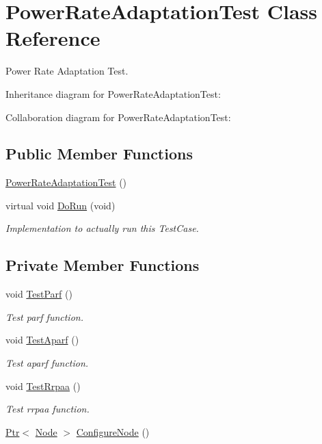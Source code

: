 \hypertarget{classPowerRateAdaptationTest}{}\section{Power\+Rate\+Adaptation\+Test Class Reference}
\label{classPowerRateAdaptationTest}


Power Rate Adaptation Test.  




Inheritance diagram for Power\+Rate\+Adaptation\+Test\+:


Collaboration diagram for Power\+Rate\+Adaptation\+Test\+:
\subsection*{Public Member Functions}
\begin{DoxyCompactItemize}
\item 
\hyperlink{classPowerRateAdaptationTest_a7c9dabaff02e1e82491e0a1106c2fcb8}{Power\+Rate\+Adaptation\+Test} ()
\item 
virtual void \hyperlink{classPowerRateAdaptationTest_aab868cfafe1fcef3c1a777720571147d}{Do\+Run} (void)
\begin{DoxyCompactList}\small\item\em Implementation to actually run this Test\+Case. \end{DoxyCompactList}\end{DoxyCompactItemize}
\subsection*{Private Member Functions}
\begin{DoxyCompactItemize}
\item 
void \hyperlink{classPowerRateAdaptationTest_a06db52c180644f3b961de054c41f2115}{Test\+Parf} ()
\begin{DoxyCompactList}\small\item\em Test parf function. \end{DoxyCompactList}\item 
void \hyperlink{classPowerRateAdaptationTest_a3c3954526cb787125fea4c50cfe76174}{Test\+Aparf} ()
\begin{DoxyCompactList}\small\item\em Test aparf function. \end{DoxyCompactList}\item 
void \hyperlink{classPowerRateAdaptationTest_af0e5f044ed9bdf20dc203926ff8677b4}{Test\+Rrpaa} ()
\begin{DoxyCompactList}\small\item\em Test rrpaa function. \end{DoxyCompactList}\item 
\hyperlink{classns3_1_1Ptr}{Ptr}$<$ \hyperlink{classns3_1_1Node}{Node} $>$ \hyperlink{classPowerRateAdaptationTest_a498edc12eed6e91b38d1b71d4565a306}{Configure\+Node} ()
\end{DoxyCompactItemize}
